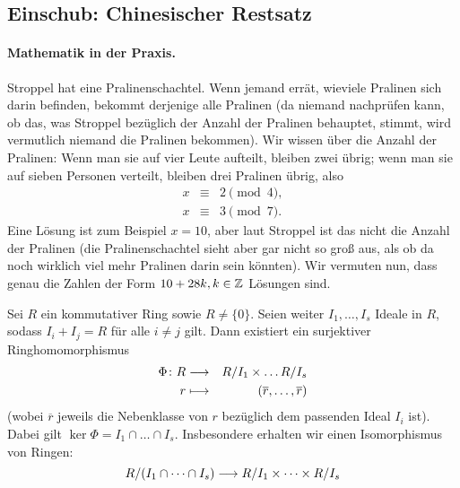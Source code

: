 \documentclass[12pt,a4paper]{scrartcl}
\begin{document}
\subsection{Einschub: Chinesischer Restsatz}
\paragraph{Mathematik in der Praxis.}
Stroppel hat eine Pralinenschachtel. Wenn jemand errät, wieviele Pralinen sich darin befinden, bekommt derjenige alle Pralinen (da niemand nachprüfen kann, ob das, was Stroppel bezüglich der Anzahl der Pralinen behauptet, stimmt, wird vermutlich niemand die Pralinen bekommen). Wir wissen über die Anzahl der Pralinen: Wenn man sie auf vier Leute aufteilt, bleiben zwei übrig; wenn man sie auf sieben Personen verteilt, bleiben drei Pralinen übrig, also
\begin{eqnarray*}
	x &\equiv & 2 \pmod 4,\\
	x &\equiv & 3 \pmod 7.
\end{eqnarray*}
Eine Lösung ist zum Beispiel $x = 10$, aber laut Stroppel ist das nicht die Anzahl der Pralinen (die Pralinenschachtel sieht aber gar nicht so groß aus, als ob da noch wirklich viel mehr Pralinen darin sein könnten). Wir vermuten nun, dass genau die Zahlen der Form $10+28k, k\in\mathbb Z$ Lösungen sind.

\begin{satz}
	Sei $R$ ein kommutativer Ring sowie $R\neq\{0\}$. Seien weiter $I_1,\dots,I_s$ Ideale in $R$, sodass $I_i+I_j = R$ für alle $i\neq j$ gilt. Dann existiert ein surjektiver Ringhomomorphismus
	\begin{eqnarray*}
		\Phi\colon R & \longrightarrow & R/I_1\times \dots R/I_s\\
		r & \longmapsto & (\overline{r},\dots, \overline{r})
	\end{eqnarray*}
	\textup(wobei $\overline{r}$ jeweils die Nebenklasse von $r$ bezüglich dem passenden Ideal $I_i$ ist\textup).
	Dabei gilt $\ker\Phi = I_1\cap\dots\cap I_s$. Insbesondere erhalten wir einen Isomorphismus von Ringen:
	$$ R/(I_1\cap\dots\cap I_s) \longrightarrow R/I_1 \times\dots \times R/I_s$$
	
\end{satz}
\end{document}
